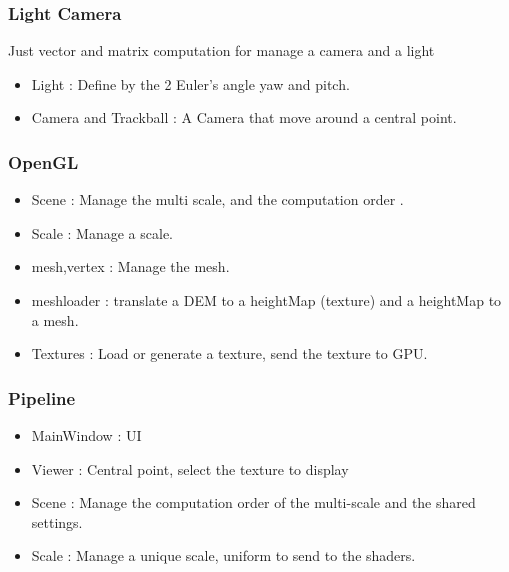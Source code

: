 \documentclass[a4paper]{article}
\begin{document}
\subsubsection{Light Camera}
Just vector and matrix computation for manage a camera and a light

\begin{itemize}
\item Light : Define by the 2 Euler's angle yaw and pitch. 
\item Camera and Trackball : A Camera that move around a central point. 
\end{itemize}


\subsubsection{OpenGL}



\begin{itemize}
\item Scene : Manage the multi scale, and the computation order . 
\item Scale : Manage a scale. 
\item mesh,vertex : Manage the mesh.
\item meshloader : translate a DEM to a heightMap (texture) and a heightMap to a mesh.
\item Textures : Load or generate a texture, send the texture to GPU.  
\end{itemize}





\subsubsection{Pipeline}
\begin{itemize}
\item MainWindow : UI
\item Viewer : Central point, select the texture to display
\item Scene : Manage the computation order of the multi-scale and the shared settings.
\item Scale : Manage a unique scale, uniform to send to the shaders. 
\end{itemize}
\end{document}
